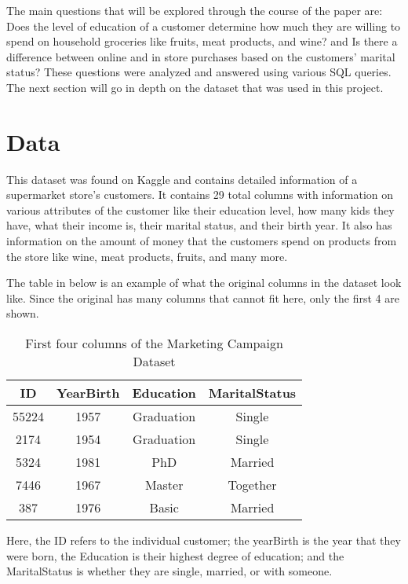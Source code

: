 \documentclass{article}
\begin{document}
The main questions that will be explored through the course of the paper are: Does the level of education of a customer determine how much they are willing to spend on household groceries like fruits, meat products, and wine? and Is there a difference between online and in store purchases based on the customers' marital status? 
These questions were analyzed and answered using various SQL queries. 
The next section will go in depth on the dataset that was used in this project. 


\section{Data}

This dataset\cite{Romero-Hernandez} was found on Kaggle and contains detailed information  of a supermarket store’s customers. It contains 29 total columns with information on various attributes of the customer like their education level, how many kids they have, what their income is, their marital status, and their birth year. It also has information on the amount of money that the customers spend on products from the store like wine, meat products, fruits, and many more. 


The table in below is an example of what the original columns in the dataset look like. Since the original has many columns that cannot fit here, only the first 4 are shown.
\begin{table}[h]
	\centering
	\caption{First four columns of the Marketing Campaign Dataset}
	\label{table1}
	\begin{tabular}{@{}cccc@{}}
		\toprule
		\textbf{ID}& \textbf{YearBirth }& \textbf{Education }& \textbf{MaritalStatus} \\
		\midrule
		55224 & 1957 & Graduation & Single \\
  	  2174 & 1954 & Graduation & Single \\
		5324 & 1981 & PhD & Married  \\
		7446 & 1967 & Master & Together  \\
		387 & 1976 & Basic & Married \\
	
	
		\bottomrule
	\end{tabular}
\end{table}

Here, the ID refers to the individual customer; the yearBirth is the year that they were born, the Education is their highest degree of education; and the MaritalStatus is whether they are single, married, or with someone. 
\end{document}
